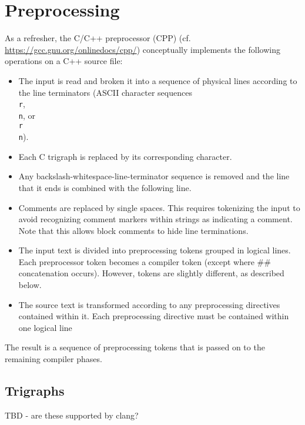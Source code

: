 \section{Preprocessing}

As a refresher, the C/C++ preprocessor (CPP) (cf. \url{https://gcc.gnu.org/onlinedocs/cpp/}) conceptually implements the following operations on a C++ source file:
\begin{itemize}
	\item The input is read and broken it into a sequence of physical lines according to the line terminators (ASCII character sequences \texttt{\\r}, \texttt{\\n}, or \texttt{\\r\\n}).
	\item Each C trigraph is replaced by its corresponding character.
	\item Any backslash-whitespace-line-terminator sequence is removed and the line that it ends is combined with the following line.
	\item Comments are replaced by single spaces. This requires tokenizing the input to avoid recognizing comment markers within strings as indicating a comment. Note that this allows block comments to hide line terminations.
	\item The input text is divided into preprocessing tokens grouped in logical lines. Each preprocessor token becomes a compiler token (except where \#\# concatenation occurs). However, \acslb tokens are slightly different, as described below.
	\item The source text is transformed according to any preprocessing directives contained within it. Each preprocessing directive must be contained within one logical line
	
\end{itemize}
The result is a sequence of preprocessing tokens that is passed on to the 
remaining compiler phases.

\subsection{Trigraphs}

TBD - are these supported by clang?

